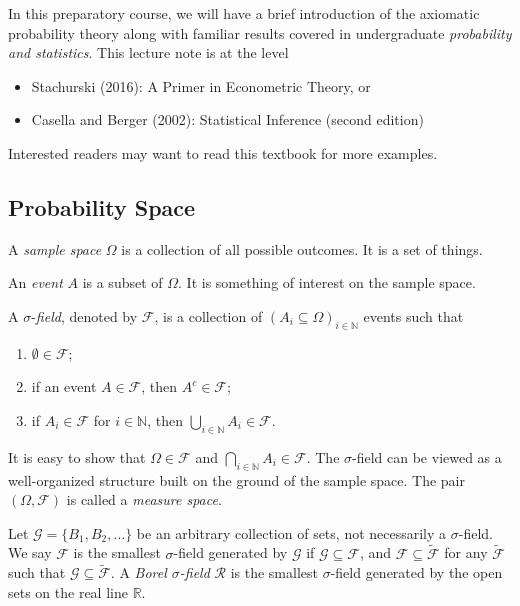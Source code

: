 \documentclass[11pt]{article}
\providecommand{\tightlist}{%
      \setlength{\itemsep}{0pt}\setlength{\parskip}{0pt}}
\begin{document}
In this preparatory course, we will have a brief introduction of the
axiomatic probability theory along with familiar results covered in
undergraduate \emph{probability and statistics}. This
lecture note is at the level

\begin{itemize}
\tightlist
\item
  Stachurski (2016): A Primer in Econometric Theory, or
\item
  Casella and Berger (2002): Statistical Inference (second edition)
\end{itemize}

Interested readers may want to read this textbook for more examples.

    \subsection{Probability Space}\label{probability-space}

A \emph{sample space} \(\Omega\) is a collection of all possible
outcomes. It is a set of things.

An \emph{event} \(A\) is a subset of \(\Omega\). It is something of
interest on the sample space.

A \(\sigma\)-\emph{field}, denoted by \(\mathcal{F}\), is a collection
of \((A_i \subseteq \Omega)_{i \in \mathbb{N}}\) events such that

\begin{enumerate}
\def\labelenumi{\arabic{enumi}.}
\tightlist
\item
  \(\emptyset\in\mathcal{F}\);
\item
  if an event \(A\in\mathcal{F}\), then \(A^{c}\in\mathcal{F}\);
\item
  if \(A_{i}\in\mathcal{F}\) for \(i\in\mathbb{N}\), then
  \(\bigcup_{i\in\mathbb{N}}A_{i}\in\mathcal{F}\).
\end{enumerate}

It is easy to show that \(\Omega \in \mathcal{F}\) and
\(\bigcap_{i\in\mathbb{N}}A_{i}\in\mathcal{F}\). The \(\sigma\)-field
can be viewed as a well-organized structure built on the ground of the
sample space. The pair \(\left(\Omega,\mathcal{F}\right)\) is called a
\emph{measure space}.

Let \(\mathcal{G} = \{B_1, B_2,\ldots\}\) be an arbitrary collection of
sets, not necessarily a \(\sigma\)-field. We say \(\mathcal{F}\) is the
smallest \(\sigma\)-field generated by \(\mathcal{G}\) if
\(\mathcal{G}\subseteq \mathcal{F}\), and
\(\mathcal{F}\subseteq \mathcal{\tilde{F}}\) for any
\(\mathcal{\tilde{F}}\) such that
\(\mathcal{G}\subseteq \mathcal{\tilde{F}}\). A \emph{Borel
\(\sigma\)-field} \(\mathcal{R}\) is the smallest \(\sigma\)-field
generated by the open sets on the real line \(\mathbb{R}\).
\end{document}
